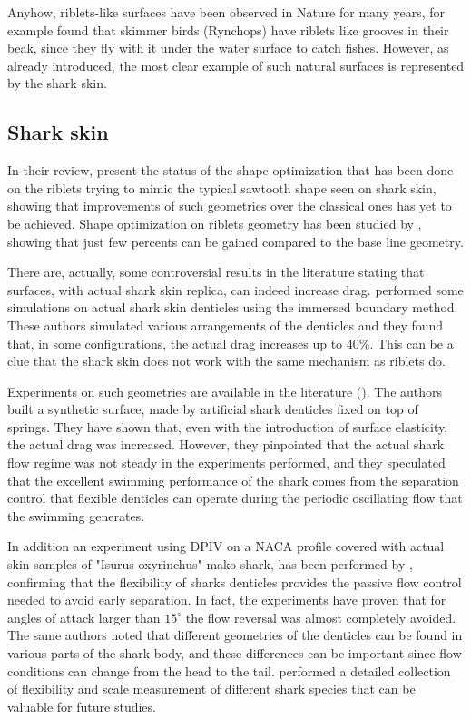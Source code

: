 Anyhow, riblets-like surfaces have been observed in Nature for many years, for example \citet{Martin2016riblets} found that skimmer birds (Rynchops) have riblets like grooves in their beak, since they fly with it under the water surface to catch fishes.
However, as already introduced, the most clear example of such natural surfaces is represented by the shark skin.

\subsection{Shark skin}
In their review, \citet{dean2010shark} present the status of the shape optimization that has been done on the riblets trying to mimic the typical sawtooth shape seen on shark skin, showing that improvements of such geometries over the classical ones has yet to be achieved.
Shape optimization on riblets geometry has been studied by \citet{bechert1997experiments}, showing that just few percents can be gained compared to the base line geometry.

There are, actually, some controversial results in the literature stating that surfaces, with actual shark skin replica, can indeed increase drag.
\citet{boomsma2016direct} performed some simulations on actual shark skin denticles using the immersed boundary method. These authors simulated various arrangements of the denticles and they found that, in some configurations, the actual drag increases up to $40\%$. This can be a clue that the shark skin does not work with the same mechanism as riblets do.

Experiments on such geometries are available in the literature (\citet{bechert1997natural}).
The authors built a synthetic surface, made by artificial shark denticles fixed on top of springs. They have shown that, even with the introduction of surface elasticity, the actual drag was increased.
However, they pinpointed that the actual shark flow regime was not steady in the experiments performed, and they speculated that the excellent swimming performance of the shark comes from the separation control that flexible denticles can operate during the periodic oscillating flow that the swimming generates.

In addition an experiment using DPIV on a NACA profile covered with actual skin samples of "Isurus oxyrinchus" mako shark, has been performed by \citet{lang2014SharkControl}, confirming that the flexibility of sharks denticles provides the passive flow control needed to avoid early separation.
In fact, the experiments have proven that for angles of attack larger than $15^{\circ}$ the flow reversal was almost completely avoided.
The same authors noted that different geometries of the denticles can be found in various parts of the shark body, and these differences can be important since flow conditions can change from the head to the tail.
\citet{motta2012Shark} performed a detailed collection of flexibility and scale measurement of different shark species that can be valuable for future studies.

